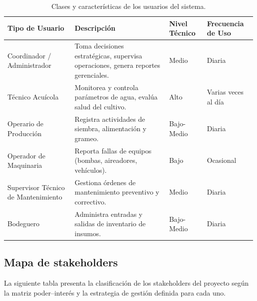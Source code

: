 \documentclass[11pt,a4paper]{article}
\begin{document}
\begin{longtable}{|p{4cm}|p{5cm}|p{2.8cm}|p{3cm}|}
\caption{Clases y características de los usuarios del sistema.}
\label{tab:usuarios} \\
\hline
\textbf{Tipo de Usuario} & \textbf{Descripción} & \textbf{Nivel Técnico} & \textbf{Frecuencia de Uso} \\
\hline
Coordinador / Administrador & Toma decisiones estratégicas, supervisa operaciones, genera reportes gerenciales. & Medio & Diaria \\
\hline
Técnico Acuícola & Monitorea y controla parámetros de agua, evalúa salud del cultivo. & Alto & Varias veces al día \\
\hline
Operario de Producción & Registra actividades de siembra, alimentación y grameo. & Bajo-Medio & Diaria \\
\hline
Operador de Maquinaria & Reporta fallas de equipos (bombas, aireadores, vehículos). & Bajo & Ocasional \\
\hline
Supervisor Técnico de Mantenimiento & Gestiona órdenes de mantenimiento preventivo y correctivo. & Medio & Diaria \\
\hline
Bodeguero & Administra entradas y salidas de inventario de insumos. & Bajo-Medio & Diaria \\
\hline
\end{longtable}

\vspace{0.3cm}


\subsection{Mapa de stakeholders}
La siguiente tabla presenta la clasificación de los stakeholders del proyecto según la matriz poder--interés y la estrategia de gestión definida para cada uno.
\end{document}
